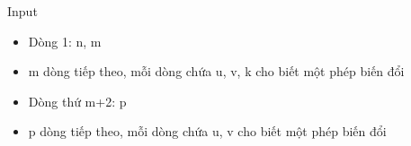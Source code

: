 Input
\begin{itemize}
	\item     Dòng 1: n, m   
	\item     m dòng tiếp theo, mỗi dòng chứa u, v, k cho biết một phép biến đổi   
	\item     Dòng thứ m+2: p   
	\item     p dòng tiếp theo, mỗi dòng chứa u, v cho biết một phép biến đổi    



\end{itemize}